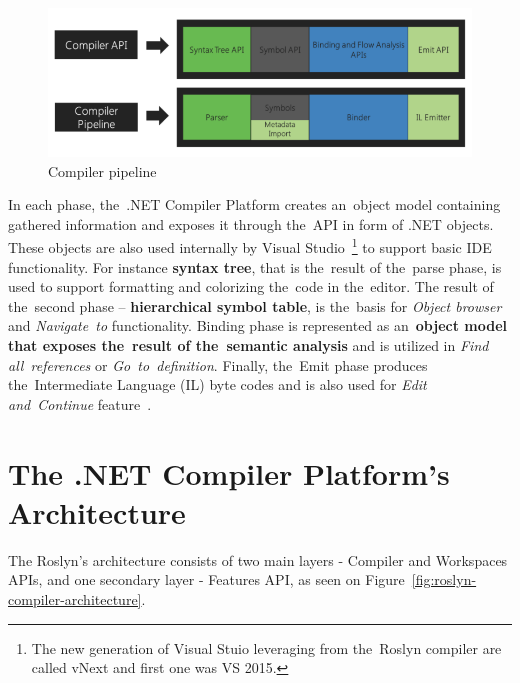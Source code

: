 \documentclass[
  digital, %
  table,   %
  lof,     %
  lot,     %
  oneside,
]{fithesis3}
\begin{document}
\begin{figure}[h!]
		\centering
			\includegraphics[scale=0.5]{img/roslyn-compiler-pipeline}
		\caption{Compiler pipeline~\cite{roslyn-overview}}
		\label{fig:roslyn-compiler-pipeline}
\end{figure}

In each phase, the~.NET Compiler Platform creates an~object model containing gathered information and exposes it through the~API in form of .NET objects. These objects are also used internally by Visual Studio~\footnote{The new generation of Visual Stuio leveraging from the~Roslyn compiler are called vNext and first one was VS 2015.} to support basic IDE functionality. For instance \textbf{syntax tree}, that is the~result of the~parse phase, is used to support formatting and colorizing the~code in the~editor. The result of the~second phase -- \textbf{hierarchical symbol table}, is the~basis for \textit{Object browser} and \textit{Navigate~to} functionality. Binding phase is represented as an~\textbf{object model that exposes the~result of the~semantic analysis} and is utilized in \textit{Find all~references} or \textit{Go~to~definition}. Finally, the~Emit phase produces the~Intermediate Language (IL) byte codes and is also used for \textit{Edit and~Continue} feature~\cite{roslyn-overview}.

\section{The .NET Compiler Platform's Architecture}
The Roslyn's architecture consists of two main layers - Compiler and Workspaces APIs, and one secondary layer - Features API, as seen on Figure~\ref{fig:roslyn-compiler-architecture}.
\end{document}
